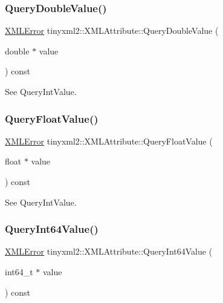 \subsubsection{\texorpdfstring{Query\+Double\+Value()}{QueryDoubleValue()}}
{\footnotesize\ttfamily \mbox{\hyperlink{namespacetinyxml2_a1fbf88509c3ac88c09117b1947414e08}{X\+M\+L\+Error}} tinyxml2\+::\+X\+M\+L\+Attribute\+::\+Query\+Double\+Value (\begin{DoxyParamCaption}\item[{double $\ast$}]{value }\end{DoxyParamCaption}) const}



See Query\+Int\+Value. 

\mbox{\label{classtinyxml2_1_1_x_m_l_attribute_a049dea6449a6259b6cfed44a9427b607}} 
\subsubsection{\texorpdfstring{Query\+Float\+Value()}{QueryFloatValue()}}
{\footnotesize\ttfamily \mbox{\hyperlink{namespacetinyxml2_a1fbf88509c3ac88c09117b1947414e08}{X\+M\+L\+Error}} tinyxml2\+::\+X\+M\+L\+Attribute\+::\+Query\+Float\+Value (\begin{DoxyParamCaption}\item[{float $\ast$}]{value }\end{DoxyParamCaption}) const}



See Query\+Int\+Value. 

\mbox{\label{classtinyxml2_1_1_x_m_l_attribute_a4e25344d6e4159026be34dbddf1dcac2}} 
\subsubsection{\texorpdfstring{Query\+Int64\+Value()}{QueryInt64Value()}}
{\footnotesize\ttfamily \mbox{\hyperlink{namespacetinyxml2_a1fbf88509c3ac88c09117b1947414e08}{X\+M\+L\+Error}} tinyxml2\+::\+X\+M\+L\+Attribute\+::\+Query\+Int64\+Value (\begin{DoxyParamCaption}\item[{int64\+\_\+t $\ast$}]{value }\end{DoxyParamCaption}) const}



